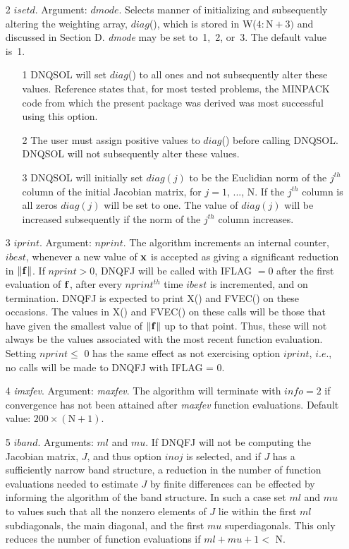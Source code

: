\documentclass[twoside]{MATH77}
\begin{document}
\begin{description}
\begin{itemize}
\item[2]  $isetd$. Argument: $dmode$. Selects manner of initializing and
subsequently altering the weighting array, $diag$(), which is stored in W($4:%
\text{N}+3)$ and discussed in Section D.  {\em dmode} may be set to~1,~2, or~3. The
default value is~1.

\begin{itemize}
\item[1] DNQSOL will set $diag$() to all ones and not subsequently alter
these values.  Reference \cite{Powell:AHM:1970} states that, for most
tested problems, the MINPACK code from which the present package was
derived was most successful using this option.

\item[2]  The user must assign positive values to $diag$() before calling
DNQSOL. DNQSOL will not subsequently alter these values.

\item[3]  DNQSOL will initially set $diag(j)$ to be the Euclidian norm of
the $j^{th}$ column of the initial Jacobian matrix, for $j=1$, ..., N. If
the $j^{th}$ column is all zeros $diag(j)$ will be set to one. The value of
$diag(j)$ will be increased subsequently if the norm of the $j^{th}$ column
increases.
\end{itemize}

\item[3]  $iprint$. Argument: $nprint$. The algorithm increments an internal
counter, $ibest$, whenever a new value of ${\bf x}$ is accepted as giving a
significant reduction in $\Vert {\bf f}\Vert $. If $nprint >0$, DNQFJ will
be called with IFLAG $=0$ after the first evaluation of ${\bf f}$, after
every $nprint^{th}$ time $ibest$ is incremented, and on termination. DNQFJ is
expected to print X() and FVEC() on these occasions. The values in X() and
FVEC() on these calls will be those that have given the smallest value of $%
\Vert {\bf f}\Vert $ up to that point. Thus, these will not always be the
values associated with the most recent function evaluation. Setting $nprint
\leq $ 0 has the same effect as not exercising option $iprint$, $i.e.$, no
calls will be made to DNQFJ with IFLAG = 0.

\item[4]  {\em imxfev}. Argument: {\em maxfev}. The algorithm will terminate with $%
info=2 $ if convergence has not been attained after {\em maxfev} function
evaluations. Default value: $200 \times (\text{N}+1).$

\item[5]  $iband$. Arguments: $ml$ and $mu$. If DNQFJ will not be computing the
Jacobian matrix, $J$, and thus option $inoj$ is selected, and if $J$ has a
sufficiently narrow band structure, a reduction in the number of function
evaluations needed to estimate $J$ by finite differences can be effected by
informing the algorithm of the band structure. In such a case set $ml$ and $mu$
to values such that all the nonzero elements of $J$ lie within the first $ml$
subdiagonals, the main diagonal, and the first $mu$ superdiagonals. This only
reduces the number of function evaluations if $ml+mu+1<$ N.


\end{itemize}
\end{description}
\end{document}

